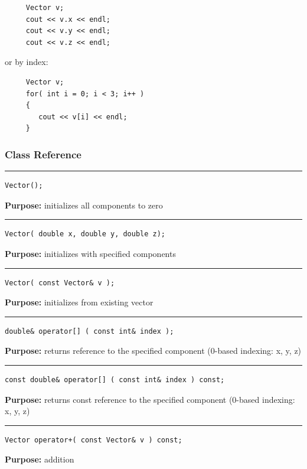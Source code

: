 \documentclass{article}
\begin{document}
 \begin{verbatim}
     Vector v;
     cout << v.x << endl;
     cout << v.y << endl;
     cout << v.z << endl;
 \end{verbatim}
\vspace{-\baselineskip} or by index: 

 \begin{verbatim}
     Vector v;
     for( int i = 0; i < 3; i++ )
     {
        cout << v[i] << endl;
     }
 \end{verbatim}
\vspace{-\baselineskip}

\subsubsection{Class Reference}

\rule{5in}{1pt}
\begin{verbatim}
Vector();
\end{verbatim}
\textbf{Purpose:}
initializes all components to zero

\hspace{-.21in}\rule{5in}{1pt}
\begin{verbatim}
Vector( double x, double y, double z);
\end{verbatim}
\textbf{Purpose:}
initializes with specified components

\hspace{-.21in}\rule{5in}{1pt}
\begin{verbatim}
Vector( const Vector& v );
\end{verbatim}
\textbf{Purpose:}
initializes from existing vector

\hspace{-.21in}\rule{5in}{1pt}
\begin{verbatim}
double& operator[] ( const int& index );
\end{verbatim}
\textbf{Purpose:}
returns reference to the specified component (0-based indexing: x, y, z)

\hspace{-.21in}\rule{5in}{1pt}
\begin{verbatim}
const double& operator[] ( const int& index ) const;
\end{verbatim}
\textbf{Purpose:}
returns const reference to the specified component (0-based indexing: x, y, z)

\hspace{-.21in}\rule{5in}{1pt}
\begin{verbatim}
Vector operator+( const Vector& v ) const;
\end{verbatim}
\textbf{Purpose:}
addition
\end{document}
